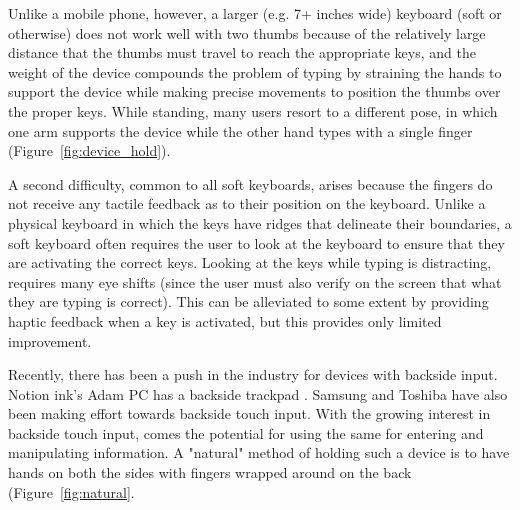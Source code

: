 Unlike a mobile phone, however, a larger (e.g. 7+ inches wide)
keyboard (soft or otherwise) does not work well with two thumbs
because of the relatively large distance that the thumbs must travel
to reach the appropriate keys, and the weight of the device compounds
the problem of typing by straining the hands to support the device
while making precise movements to position the thumbs over the proper
keys. While standing, many users resort to a different pose, in which
one arm supports the device while the other hand types with a single
finger (Figure~\ref{fig:device_hold}).

A second difficulty, common to all soft keyboards, arises because the
fingers do not receive any tactile feedback as to their position on
the keyboard.  Unlike a physical keyboard in which the keys have
ridges that delineate their boundaries, a soft keyboard often requires
the user to look at the keyboard to ensure that they are activating
the correct keys.  Looking at the keys while typing is distracting,
requires many eye shifts (since the user must also verify on the
screen that what they are typing is correct).  This can be alleviated
to some extent by providing haptic feedback when a key is activated,
but this provides only limited improvement.

Recently, there has been a push in the industry for devices with
backside input. Notion ink's Adam PC has a backside trackpad
\cite{1}. Samsung and Toshiba have also been making effort towards
backside touch input. With the growing interest in backside touch
input, comes the potential for using the same for entering and
manipulating information. A "natural" method of holding such a device
is to have hands on both the sides with fingers wrapped around on the
back (Figure~\ref{fig:natural}. 

